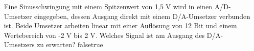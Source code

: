     {Eine Sinusschwingung mit einem Spitzenwert von 1,5 V wird in einen A/D-Umsetzer eingegeben, dessen Ausgang direkt mit einem D/A-Umsetzer verbunden ist. Beide Umsetzer arbeiten linear mit einer Auflösung von 12 Bit und einem Wertebereich von -2 V bis 2 V. Welches Signal ist am Ausgang des D/A-Umsetzers zu erwarten?}
    {}
    {}
    {}
    {}
    {false}{true}